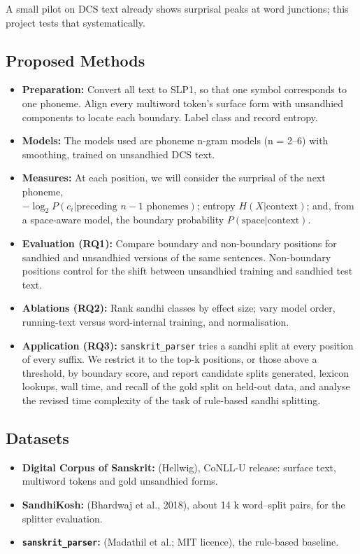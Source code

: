 \documentclass[11pt,a4paper]{article}
\begin{document}
A small pilot on DCS text already shows surprisal peaks at word junctions; this project tests that systematically.

\subsection{Proposed Methods}
\begin{itemize}
    \item \textbf{Preparation:} Convert all text to SLP1, so that one symbol corresponds to one phoneme. Align every multiword token's surface form with unsandhied components to locate each boundary. Label class and record entropy.
    \item \textbf{Models:} The models used are phoneme n-gram models (n = 2–6) with smoothing, trained on unsandhied DCS text.
    \item \textbf{Measures:}  At each position, we will consider the surprisal of the next phoneme, \\ $−\log_2P(c_i | \text{preceding }n - 1\text{ phonemes})$; entropy $H(X | \text{context})$; and, from a space-aware model, the boundary probability $P(\text{space} | \text{context})$.
    \item \textbf{Evaluation (RQ1):} Compare boundary and non-boundary positions for sandhied and unsandhied versions of the same sentences. Non-boundary positions control for the shift between unsandhied training and sandhied test text.
    \item \textbf{Ablations (RQ2):} Rank sandhi classes by effect size; vary model order, running-text versus word-internal training, and normalisation.
    \item \textbf{Application (RQ3):} \texttt{sanskrit\_parser} tries a sandhi split at every position of every suffix. We restrict it to the top-k positions, or those above a threshold, by boundary score, and report candidate splits generated, lexicon lookups, wall time, and recall of the gold split on held-out data, and analyse the revised time complexity of the task of rule-based sandhi splitting. 
\end{itemize}

\subsection{Datasets}
\begin{itemize}
    \item \textbf{Digital Corpus of Sanskrit:} (Hellwig), CoNLL-U release: surface text, multiword tokens and gold unsandhied forms.
    \item \textbf{SandhiKosh:} (Bhardwaj et al., 2018), about 14 k word–split pairs, for the splitter evaluation.
    \item \textbf{\texttt{sanskrit\_parser}:} (Madathil et al.; MIT licence), the rule-based baseline.
\end{itemize}
\end{document}
